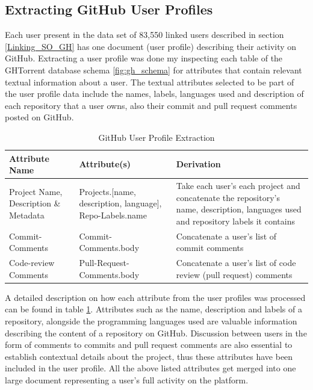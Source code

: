     \subsection{Extracting GitHub User Profiles\label{GH_userProfileExtraction}}
    
        Each user present in the data set of 83,550 linked users described in section \ref{Linking_SO_GH} has one document (user profile) describing their activity on GitHub. Extracting a user profile was done my inspecting each table of the GHTorrent database schema \ref{fig:gh_schema} for attributes that contain relevant textual information about a user. The textual attributes selected to be part of the user profile data include the names, labels, languages used and description of each repository that a user owns, also their commit and pull request comments posted on GitHub. 
        
        \begin{table}[!htbp]
            \centering
            \caption{GitHub User Profile Extraction}
            \label{tab:GH_userProfileExtraction}
            \vspace{6pt} %
            \begin{tabular}{|p{3.3cm}|p{3cm}|p{7.7cm}|}
               \toprule
               \textbf{Attribute Name} & \textbf{Attribute(s)} & \textbf{Derivation} \\
               \toprule
                Project Name, Description \& Metadata & Projects.[name, description, language], Repo-Labels.name & Take each user's each project and concatenate the repository's name, description, languages used and repository labels it contains\\  
                Commit-Comments & Commit-Comments.body & Concatenate a user's list of commit comments \\
                Code-review Comments & Pull-Request-Comments.body & Concatenate a user's list of code review (pull request) comments \\
               \bottomrule
            \end{tabular}
        \end{table}
        
        A detailed description on how each attribute from the user profiles was processed can be found in table \ref{tab:GH_userProfileExtraction}. Attributes such as the name, description and labels of a repository, alongside the programming languages used are valuable information describing the content of a repository on GitHub. Discussion between users in the form of comments to commits and pull request comments are also essential to establish contextual details about the project, thus these attributes have been included in the user profile. All the above listed attributes get merged into one large document representing a user's full activity on the platform. 
        
